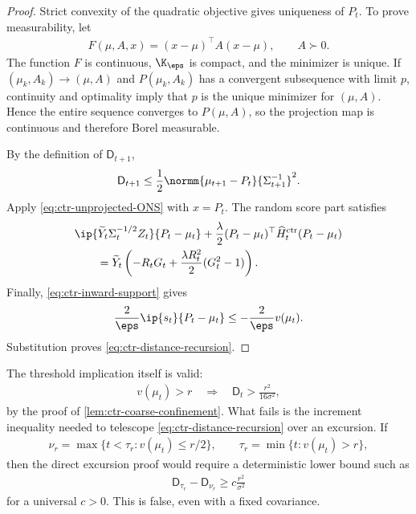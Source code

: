 \begin{proof}
    Strict convexity of the quadratic objective gives uniqueness of $P_t$.
    To prove measurability, let
    \begin{align}
        F(\mu,A,x)=(x-\mu)^\top A(x-\mu),
        \qquad A\succ0.
    \end{align}
    The function $F$ is continuous, $\K_\eps$ is compact, and the minimizer is
    unique.  If $(\mu_k,A_k)\to(\mu,A)$ and $P(\mu_k,A_k)$ has a convergent
    subsequence with limit $p$, continuity and optimality imply that $p$ is
    the unique minimizer for $(\mu,A)$.  Hence the entire sequence converges
    to $P(\mu,A)$, so the projection map is continuous and therefore Borel
    measurable.

    By the definition of $\mathsf D_{t+1}$,
    \begin{align}
        \mathsf D_{t+1}
        \leq\frac12
        \normm{\mu_{t+1}-P_t}{\Sigma_{t+1}^{-1}}^2.
    \end{align}
    Apply \eqref{eq:ctr-unprojected-ONS} with $x=P_t$.  The random score part
    satisfies
    \begin{align}
         & \ip{
            \widetilde Y_t\Sigma_t^{-1/2}Z_t
        }{P_t-\mu_t}
        +\frac\lambda2
        (P_t-\mu_t)^\top\widehat H_t^{\mathrm{ctr}}
        (P_t-\mu_t)
        \\
         & \qquad=
        \widetilde Y_t
        \left(
        -R_tG_t
        +\frac{\lambda R_t^2}{2}(G_t^2-1)
        \right).
    \end{align}
    Finally, \eqref{eq:ctr-inward-support} gives
    \begin{align}
        \frac2\eps\ip{s_t}{P_t-\mu_t}
        \leq-\frac2\eps v(\mu_t).
    \end{align}
    Substitution proves \eqref{eq:ctr-distance-recursion}.
\end{proof}

The threshold implication itself is valid:
\begin{align}
    v(\mu_t)>r
    \quad\Longrightarrow\quad
    \mathsf D_t>\frac{r^2}{16\sigma^2},
    \label{eq:ctr-valid-distance-threshold}
\end{align}
by the proof of \cref{lem:ctr-coarse-confinement}.  What fails is the
increment inequality needed to telescope
\eqref{eq:ctr-distance-recursion} over an excursion.  If
\begin{align}
    \nu_r
    =\max\{t<\tau_r:v(\mu_t)\leq r/2\},
    \qquad
    \tau_r=\min\{t:v(\mu_t)>r\},
\end{align}
then the direct excursion proof would require a deterministic lower bound such
as
\begin{align}
    \mathsf D_{\tau_r}-\mathsf D_{\nu_r}
    \geq c\frac{r^2}{\sigma^2}
    \label{eq:ctr-false-excursion-increment}
\end{align}
for a universal $c>0$.  This is false, even with a fixed covariance.

